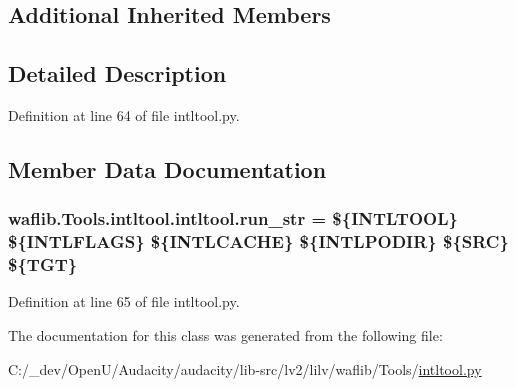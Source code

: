 \subsection*{Additional Inherited Members}


\subsection{Detailed Description}


Definition at line 64 of file intltool.\+py.



\subsection{Member Data Documentation}
\subsubsection[{\texorpdfstring{run\+\_\+str}{run_str}}]{ waflib.\+Tools.\+intltool.\+intltool.\+run\+\_\+str = \textquotesingle{}\$\{I\+N\+T\+L\+T\+O\+OL\} \$\{I\+N\+T\+L\+F\+L\+A\+GS\} \$\{I\+N\+T\+L\+C\+A\+C\+HE\} \$\{I\+N\+T\+L\+P\+O\+D\+IR\} \$\{S\+RC\} \$\{T\+GT\}\textquotesingle{}\hspace{0.3cm}{\ttfamily [static]}}\hypertarget{classwaflib_1_1_tools_1_1intltool_1_1intltool_ae5d29c979d1f65ebd2094e89f0e58474}{}\label{classwaflib_1_1_tools_1_1intltool_1_1intltool_ae5d29c979d1f65ebd2094e89f0e58474}


Definition at line 65 of file intltool.\+py.



The documentation for this class was generated from the following file\+:\begin{DoxyCompactItemize}
\item 
C\+:/\+\_\+dev/\+Open\+U/\+Audacity/audacity/lib-\/src/lv2/lilv/waflib/\+Tools/\hyperlink{lilv_2waflib_2_tools_2intltool_8py}{intltool.\+py}\end{DoxyCompactItemize}

